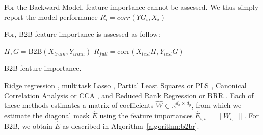 For the Backward Model, feature importance cannot be assessed. We thus simply
report the model performance $R_i = corr(YG_i, X_i)$

For, B2B feature importance is assessed as follow:


\begin{algorithm}[H]
      $H, G = \text{B2B}(X_{train}, Y_{train})$\;
$R_{full} = \text{corr}(X_{test} H, Y_{test} G)$\;

 \caption{B2B feature importance.} \label{algorithm:cdp_fi}
\end{algorithm}

\iffalse Ridge regression \citep{hoerl1959optimum}, multitask Lasso
\citep{argyriou2008convex}, Partial Least Squares or PLS \citep{wold_pls,
tenenhaus_pls}, Canonical Correlation Analysis or CCA \citep{cca_hotelling}, and
Reduced Rank Regression or RRR \citep{Izenman_rrr}.
%
Each of these methods estimates a matrix of coefficients $\hat{W} \in
\mathbb{R}^{d_x \times d_y}$, from which we estimate the diagonal mask $\hat{E}$
using the feature importances $\hat{E}_{i,i} = \| W_{i, :} \|$.
%
For B2B, we obtain $\hat{E}$ as described in Algorithm~\ref{algorithm:b2br}.
%



